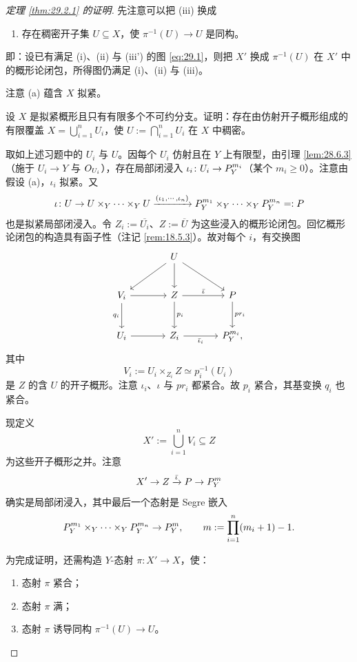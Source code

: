 \begin{proof}[定理 \ref{thm:29.2.1} 的证明]
先注意可以把 (iii) 换成
\begin{enumerate}[label=(\roman*),leftmargin=2.6em,itemsep=0.25ex,start=3]
  \item[\textup{(iii')}] 存在稠密开子集 $U\subseteq X$，使 $\pi^{-1}(U)\to U$ 是同构。
\end{enumerate}
即：设已有满足 (i)、(ii) 与 (iii') 的图 \eqref{eq:29.1}，则把 $X'$ 换成 $\pi^{-1}(U)$ 在 $X'$ 中的概形论闭包，所得图仍满足 (i)、(ii) 与 (iii)。

注意 (a) 蕴含 $X$ 拟紧。

\begin{exercise}\label{exc:29.2.6}
设 $X$ 是拟紧概形且只有有限多个不可约分支。证明：存在由仿射开子概形组成的有限覆盖 $X=\bigcup_{i=1}^nU_i$，使 $U:=\bigcap_{i=1}^nU_i$ 在 $X$ 中稠密。
\end{exercise}

取如上述习题中的 $U_i$ 与 $U$。因每个 $U_i$ 仿射且在 $Y$ 上有限型，由引理 \ref{lem:28.6.3}（施于 $U_i\to Y$ 与 $O_{U_i}$），存在局部闭浸入 $\iota_i\colon U_i\to P^{m_i}_Y$（某个 $m_i\ge 0$）。注意由假设 (a)，$\iota_i$ 拟紧。又
\[
\iota\colon U\to U\times_Y\cdots\times_Y U\xrightarrow{(\iota_1,\cdots,\iota_n)}P^{m_1}_Y\times_Y\cdots\times_YP^{m_n}_Y=:P
\]
也是拟紧局部闭浸入。令 $Z_i:=\overline{U_i}$、$Z:=\overline U$ 为这些浸入的概形论闭包。回忆概形论闭包的构造具有函子性（注记 \ref{rem:18.5.3}）。故对每个 $i$，有交换图
\[
\begin{tikzcd}[column sep=3.6em, row sep=2.6em]
& U \arrow[dl] \arrow[d] \arrow[dr] & \\
V_i \arrow[r] \arrow[d, "q_i"'] & Z \arrow[r, "\bar\iota"] \arrow[d, "p_i"] & P \arrow[d, "pr_i"] \\
U_i \arrow[r] & Z_i \arrow[r, "\bar\iota_i"'] & \PP^{m_i}_Y,
\end{tikzcd}
\]
其中
\[
V_i := U_i\times_{Z_i}Z\simeq p_i^{-1}(U_i)
\]
是 $Z$ 的含 $U$ 的开子概形。注意 $\iota_i$、$\iota$ 与 $pr_i$ 都紧合。故 $p_i$ 紧合，其基变换 $q_i$ 也紧合。

现定义
\[
X' := \bigcup_{i=1}^nV_i \subseteq Z
\]
为这些开子概形之并。注意
\[
X'\to Z\xrightarrow{\bar\iota}P\to P^m_Y
\]
确实是局部闭浸入，其中最后一个态射是 Segre 嵌入
\[
P^{m_1}_Y\times_Y\cdots\times_YP^{m_n}_Y\to P^m_Y,\qquad m:=\prod_{i=1}^n(m_i+1)-1.
\]

为完成证明，还需构造 $Y$-态射 $\pi\colon X'\to X$，使：
\begin{enumerate}[label=(\arabic*),leftmargin=2.4em,itemsep=0.25ex]
  \item 态射 $\pi$ 紧合；
  \item 态射 $\pi$ 满；
  \item 态射 $\pi$ 诱导同构 $\pi^{-1}(U)\to U$。
\end{enumerate}


\end{proof}
